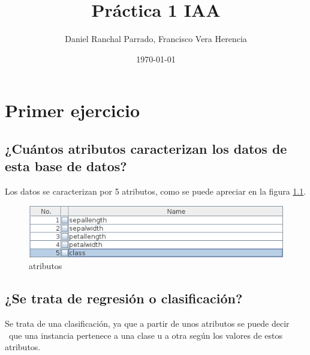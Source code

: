 \documentclass[11pt,twoside,a4paper]{book}
\title{\Huge Práctica 1 IAA}
\author{Daniel Ranchal Parrado, Francisco Vera Herencia}
\date{\today}
\begin{document}
\maketitle
%
%

\renewcommand\bibname{Bibliografía}
\renewcommand\tablename{Tabla}

 \fancyhf{} \pagestyle{fancy}
\fancyhead[LO]{\leftmark} %
\fancyhead[RE]{\leftmark} %
\fancyhead[RO,LE]{\thepage} %
\setlength{\headheight}{14pt}
\renewcommand{\sectionmark}[1]{\markright{{\thesection. #1}}} %

\tableofcontents
\listoffigures

\chapter{Primer ejercicio}
\section{¿Cuántos atributos caracterizan los datos de esta base de datos?}
Los datos se caracterizan por 5 atributos, como se puede apreciar en la figura \ref{Fig1}.
\begin{figure}[H]
   \includegraphics[width=\textwidth]{attributes.png}
   \caption{atributos}
   \label{Fig1}
\end{figure}

\section{¿Se trata de regresión o clasificación?}
Se trata de una clasificación, ya que a partir de unos atributos se puede decir \
que una instancia pertenece a una clase u a otra según los valores de estos atributos.
\end{document}
